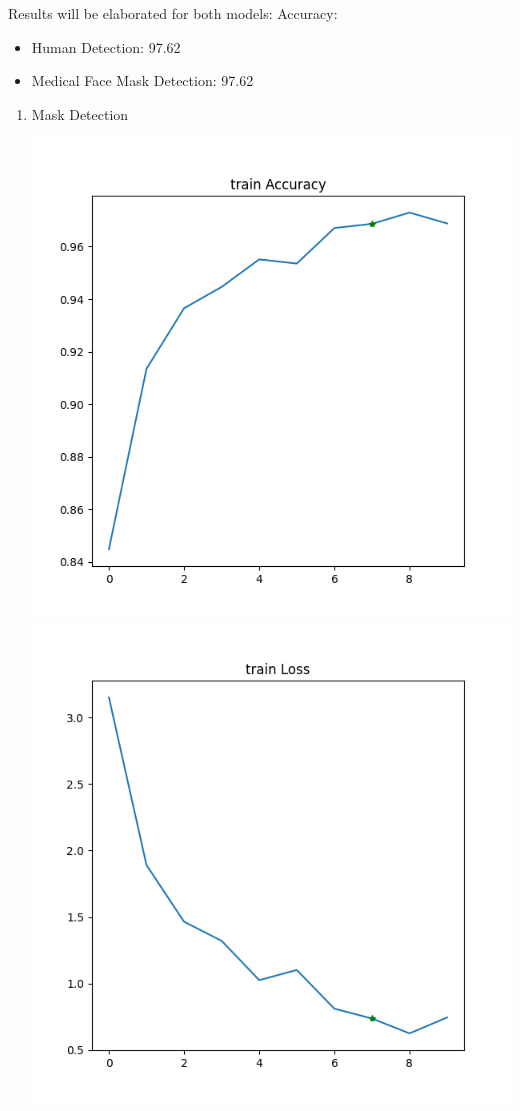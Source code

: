 Results will be elaborated for both models:
Accuracy:
\begin{itemize}
    \item Human Detection: 97.62%
    \item Medical Face Mask Detection: 97.62%
\end{itemize}

\begin{enumerate}
    \item Mask Detection


    \includegraphics[scale=0.5]{images/report/FaceMask-train-accuracy}
    \includegraphics[scale=0.5]{images/report/FaceMask-train-loss}


\end{enumerate}
